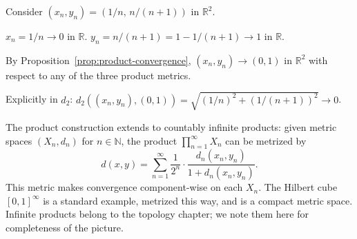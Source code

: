 \begin{example}
\label{ex:product-convergence-R2}
Consider $(x_n, y_n) = (1/n,\, n/(n+1))$ in $\mathbb{R}^2$.

$x_n = 1/n \to 0$ in $\mathbb{R}$.
$y_n = n/(n+1) = 1 - 1/(n+1) \to 1$ in $\mathbb{R}$.

By Proposition~\ref{prop:product-convergence},
$(x_n, y_n) \to (0, 1)$ in $\mathbb{R}^2$
with respect to any of the three product metrics.

Explicitly in $d_2$:
$d_2((x_n,y_n),(0,1)) = \sqrt{(1/n)^2 + (1/(n+1))^2} \to 0$.
\end{example}

\begin{remark*}
The product construction extends to countably infinite products:
given metric spaces $(X_n, d_n)$ for $n \in \mathbb{N}$, the product
$\prod_{n=1}^\infty X_n$ can be metrized by
\[
d(x, y) = \sum_{n=1}^\infty \frac{1}{2^n} \cdot
           \frac{d_n(x_n, y_n)}{1 + d_n(x_n, y_n)}.
\]
This metric makes convergence component-wise on each $X_n$.
The Hilbert cube $[0,1]^\infty$ is a standard example,
metrized this way, and is a compact metric space.
Infinite products belong to the topology chapter;
we note them here for completeness of the picture.
\end{remark*}
